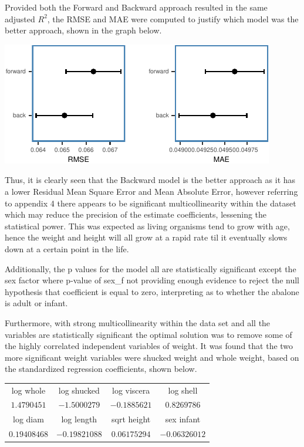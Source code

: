 \documentclass[letterpaper,9pt,twocolumn,twoside,]{pinp}
\begin{document}
Provided both the Forward and Backward approach resulted in the same
adjusted \(R^2\), the RMSE and MAE were computed to justify which model
was the better approach, shown in the graph below.

\begin{center}\includegraphics{ExecSum_files/figure-latex/unnamed-chunk-8-1} \end{center}

Thus, it is clearly seen that the Backward model is the better approach
as it has a lower Residual Mean Square Error and Mean Absolute Error,
however referring to appendix 4 there appears to be significant
multicollinearity within the dataset which may reduce the precision of
the estimate coefficients, lessening the statistical power. This was
expected as living organisms tend to grow with age, hence the weight and
height will all grow at a rapid rate til it eventually slows down at a
certain point in the life.

\par

Additionally, the p values for the model all are statistically
significant except the sex factor where p-value of sex\_f not providing
enough evidence to reject the null hypothesis that coefficient is equal
to zero, interpreting as to whether the abalone is adult or infant.

\par

Furthermore, with strong multicollinearity within the data set and all
the variables are statistically significant the optimal solution was to
remove some of the highly correlated independent variables of weight. It
was found that the two more significant weight variables were shucked
weight and whole weight, based on the standardized regression
coefficients, shown below.

\vspace{2mm}
\begin{tabular}{c c c c}
  log whole & log shucked & log viscera & log shell \\
  $1.4790451$ & $-1.5000279$ & $-0.1885621$ & $0.8269786$ \\
\hline
  log diam & log length & sqrt height & sex infant \\
  $0.19408468$ & $-0.19821088$ & $0.06175294$ & $-0.06326012$
\end{tabular}
\vspace{2mm}
\end{document}
